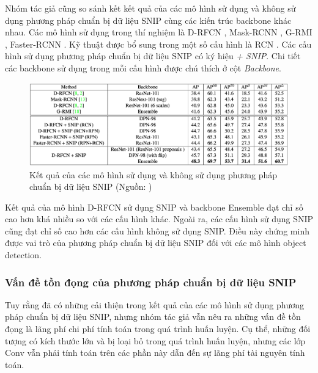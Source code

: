 {    \noindent
    Nhóm tác giả cũng so sánh kết kết quả của các mô hình sử dụng và không sử dụng phương pháp chuẩn bị dữ liệu SNIP cùng các kiến trúc backbone khác nhau.
    Các mô hình sử dụng trong thí nghiệm là D-RFCN \cite{}, Mask-RCNN \cite{}, G-RMI \cite{}, Faster-RCNN \cite{}.
    Kỹ thuật được bổ sung trong một số cấu hình là RCN \cite{}.
    Các cấu hình sử dụng phương pháp chuẩn bị dữ liệu SNIP có ký hiệu \textit{+ SNIP}.
    Chi tiết các backbone sử dụng trong mỗi cấu hình được chú thích ở cột \textit{Backbone}.
    
    \begin{figure}[H]
        \centering
        \includegraphics[width=16cm] {images/snip_results_2}
        \caption{Kết quả của các mô hình sử dụng và không sử dụng phương pháp chuẩn bị dữ liệu SNIP (Nguồn: \cite{singh2018analysis})}
        \label{fig:snip_results_2}
    \end{figure}

    \noindent
    Kết quả của mô hình D-RFCN sử dụng SNIP và backbone Ensemble đạt chỉ số cao hơn khá nhiều so với các cấu hình khác.
    Ngoài ra, các cấu hình sử dụng SNIP cũng đạt chỉ số cao hơn các cấu hình không sử dụng SNIP.
    Điều này chứng minh được vai trò của phương pháp chuẩn bị dữ liệu SNIP đối với các mô hình object detection.

    \subsubsection*{Vấn đề tồn đọng của phương pháp chuẩn bị dữ liệu SNIP}
    Tuy rằng đã có những cải thiện trong kết quả của các mô hình sử dụng phương pháp chuẩn bị dữ liệu SNIP, nhưng nhóm tác giả vẫn nêu ra những vấn đề tồn đọng là lãng phí chi phí tính toán trong quá trình huấn luyện.
    Cụ thể, những đối tượng có kích thước lớn và bị loại bỏ trong quá trình huấn luyện, nhưng các lớp Conv  vẫn phải tính toán trên các phần này dẫn đến sự lãng phí tài nguyên tính toán.
}